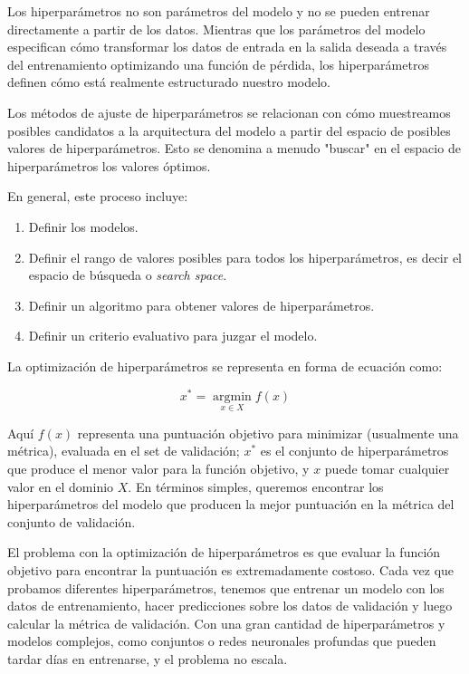 \documentclass[a4paper,12pt]{article}
\begin{document}
Los hiperparámetros no son parámetros del modelo y no se pueden entrenar directamente a partir de los datos. Mientras que los parámetros del modelo especifican cómo transformar los datos de entrada en la salida deseada a través del entrenamiento optimizando una función de pérdida, los hiperparámetros definen cómo está realmente estructurado nuestro modelo.

Los métodos de ajuste de hiperparámetros se relacionan con cómo muestreamos posibles candidatos a la arquitectura del modelo a partir del espacio de posibles valores de hiperparámetros. Esto se denomina a menudo "buscar" en el espacio de hiperparámetros los valores óptimos.

En general, este proceso incluye:

\begin{enumerate}[noitemsep, topsep=2pt]
	\item Definir los modelos.
	\item Definir el rango de valores posibles para todos los hiperparámetros, es decir el espacio de búsqueda o \textit{search space}.
	\item Definir un algoritmo para obtener valores de hiperparámetros.
	\item Definir un criterio evaluativo para juzgar el modelo.
\end{enumerate}

La optimización de hiperparámetros se representa en forma de ecuación como:

$$x^* = \operatorname*{argmin}_{x \in X} f(x)$$

Aquí $f(x)$ representa una puntuación objetivo para minimizar (usualmente una métrica), evaluada en el set de validación; $x^*$ es el conjunto de hiperparámetros que produce el menor valor para la función objetivo, y $x$ puede tomar cualquier valor en el dominio $X$. En términos simples, queremos encontrar los hiperparámetros del modelo que producen la mejor puntuación en la métrica del conjunto de validación.

El problema con la optimización de hiperparámetros es que evaluar la función objetivo para encontrar la puntuación es extremadamente costoso. Cada vez que probamos diferentes hiperparámetros, tenemos que entrenar un modelo con los datos de entrenamiento, hacer predicciones sobre los datos de validación y luego calcular la métrica de validación. Con una gran cantidad de hiperparámetros y modelos complejos, como conjuntos o redes neuronales profundas que pueden tardar días en entrenarse, y el problema no escala.
\end{document}
